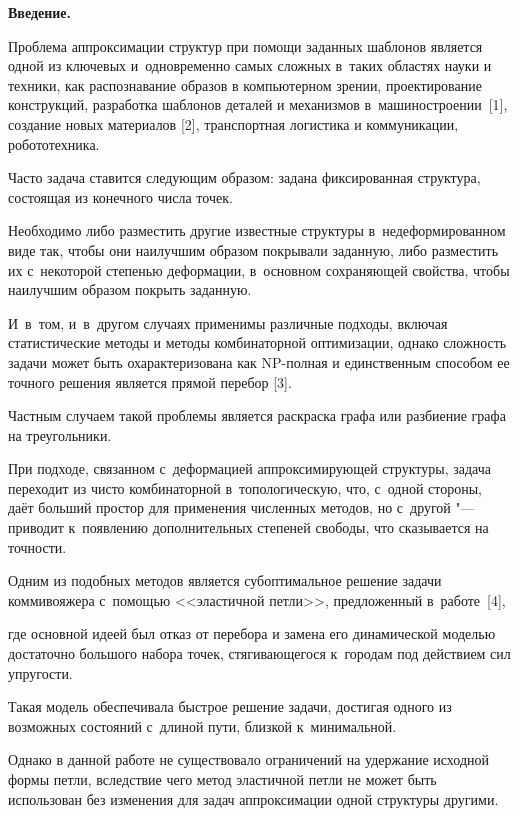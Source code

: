 \small





\textbf{Введение.}

Проблема аппроксимации структур при помощи заданных шаблонов является одной из ключевых и~одновременно самых сложных в~таких областях науки и техники, как распознавание образов в компьютерном зрении, проектирование конструкций, разработка шаблонов деталей и механизмов в~машиностроении~[1], создание новых материалов [2], транспортная логистика и коммуникации, робототехника.

Часто задача ставится следующим образом: задана фиксированная структура, состоящая из конечного числа точек.

Необходимо либо разместить другие известные структуры в~недеформированном виде так, чтобы они наилучшим образом покрывали заданную, либо разместить их с~некоторой степенью деформации, в~основном сохраняющей свойства, чтобы наилучшим образом покрыть заданную.

И~в~том, и~в~другом случаях применимы различные подходы, включая статистические методы и методы комбинаторной оптимизации, однако сложность задачи может быть охарактеризована как NP-полная и единственным способом ее точного решения является прямой перебор [3].

Частным случаем такой проблемы является раскраска графа или разбиение графа на треугольники.

При подходе, связанном с~деформацией аппроксимирующей структуры, задача переходит из чисто комбинаторной в~топологическую, что, с~одной стороны, даёт больший простор для применения численных методов, но с~другой "--- приводит к~появлению дополнительных степеней свободы, что сказывается на точности.

Одним из подобных методов является субоптимальное решение задачи коммивояжера с~помощью <<эластичной петли>>, предложенный в~работе~[4],

где основной идеей был отказ от перебора и замена его динамической моделью достаточно большого набора точек, стягивающегося к~городам под действием сил упругости.

Такая модель обеспечивала быстрое решение задачи, достигая одного из возможных состояний с~длиной пути, близкой к~минимальной.

Однако в данной работе не существовало ограничений на удержание исходной формы петли, вследствие чего метод эластичной петли не может быть использован без изменения для задач аппроксимации одной структуры другими.

